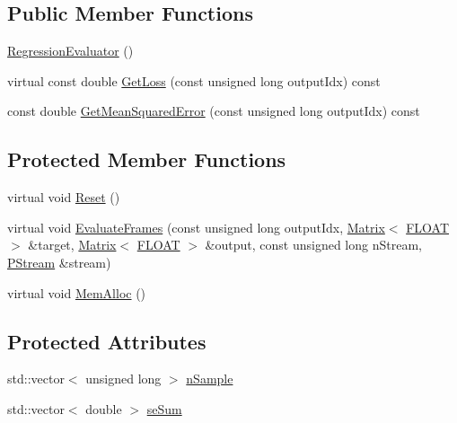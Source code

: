 \subsection*{Public Member Functions}
\begin{DoxyCompactItemize}
\item 
\hyperlink{classfractal_1_1RegressionEvaluator_a52a29990f3eee02f9792c38b4f765e95}{Regression\+Evaluator} ()
\item 
virtual const double \hyperlink{classfractal_1_1RegressionEvaluator_ab1b2e523dfb7a9886f9637541670b3e7}{Get\+Loss} (const unsigned long output\+Idx) const 
\item 
const double \hyperlink{classfractal_1_1RegressionEvaluator_a2833c1db6df6a332ab9fa62f62269c42}{Get\+Mean\+Squared\+Error} (const unsigned long output\+Idx) const 
\end{DoxyCompactItemize}
\subsection*{Protected Member Functions}
\begin{DoxyCompactItemize}
\item 
virtual void \hyperlink{classfractal_1_1RegressionEvaluator_a3e7c99c111583353ae5a1ccb76cb86db}{Reset} ()
\item 
virtual void \hyperlink{classfractal_1_1RegressionEvaluator_ade117e7b38544fcee8c8a6518c7308b4}{Evaluate\+Frames} (const unsigned long output\+Idx, \hyperlink{classfractal_1_1Matrix}{Matrix}$<$ \hyperlink{namespacefractal_a1c2d2530689575d5ccb56bae52af70d3}{F\+L\+O\+A\+T} $>$ \&target, \hyperlink{classfractal_1_1Matrix}{Matrix}$<$ \hyperlink{namespacefractal_a1c2d2530689575d5ccb56bae52af70d3}{F\+L\+O\+A\+T} $>$ \&output, const unsigned long n\+Stream, \hyperlink{classfractal_1_1PStream}{P\+Stream} \&stream)
\item 
virtual void \hyperlink{classfractal_1_1RegressionEvaluator_ac2c59ad7a08a7a86b2d1b5585dd725c2}{Mem\+Alloc} ()
\end{DoxyCompactItemize}
\subsection*{Protected Attributes}
\begin{DoxyCompactItemize}
\item 
std\+::vector$<$ unsigned long $>$ \hyperlink{classfractal_1_1RegressionEvaluator_aee654f8276188da1e182e7fc73c491d2}{n\+Sample}
\item 
std\+::vector$<$ double $>$ \hyperlink{classfractal_1_1RegressionEvaluator_a5a0d13a04c2e3b8d82a85a6fa59a4abf}{se\+Sum}
\end{DoxyCompactItemize}
